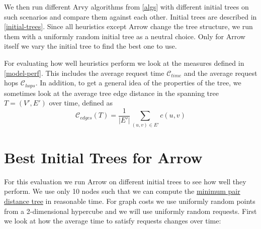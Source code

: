 \documentclass[a4paper, oneside]{discothesis}
\begin{document}
We then run different Arvy algorithms from \autoref{algs} with different initial trees on such scenarios and compare them against each other. Initial trees are described in \autoref{initial-trees}. Since all heuristics except Arrow change the tree structure, we run them with a uniformly random initial tree as a neutral choice. Only for Arrow itself we vary the initial tree to find the best one to use.

For evaluating how well heuristics perform we look at the measures defined in \autoref{model-perf}. This includes the average request time $\mathcal{C}_{time}$ and the average request hops $\mathcal{C}_{hops}$. In addition, to get a general idea of the properties of the tree, we sometimes look at the average tree edge distance in the spanning tree $T=(V',E')$ over time, defined as
\begin{equation}
\mathcal{C}_{edges}(T)=\frac{1}{|E'|}\sum_{(u,v)\in E'}c(u,v)
\end{equation}

\newcommand{\evalTime}{Average request time $\mathcal{C}_{time}$}
\newcommand{\evalHops}{Average request hops $\mathcal{C}_{hops}$}
\newcommand{\evalEdges}{Average tree edge distance $\mathcal{C}_{edges}$}


\newpage
\section{Best Initial Trees for Arrow}\label{result:trees}

For this evaluation we run Arrow on different initial trees to see how well they perform. We use only 10 nodes such that we can compute the \hyperref[tree:mpd]{minimum pair distance tree} in reasonable time. For graph costs we use uniformly random points from a 2-dimensional hypercube and we will use uniformly random requests. First we look at how the average time to satisfy requests changes over time:
\end{document}
